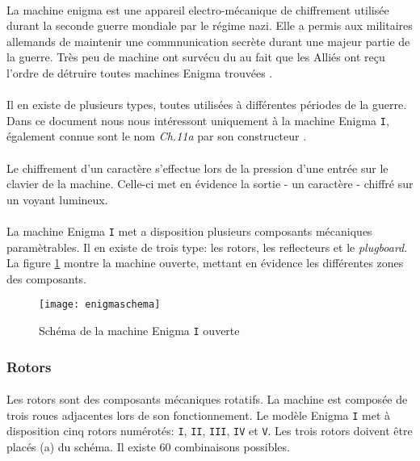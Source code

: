 \documentclass[letterpaper]{article}
\begin{document}
\paragraph{}
La machine enigma est une appareil electro-mécanique de chiffrement utilisée durant la seconde guerre mondiale
par le régime nazi. Elle a permis aux militaires allemands
de maintenir une commnunication secrète durant une majeur partie de la guerre. Très peu
de machine ont survécu du au fait que les Alliés ont reçu l'ordre de détruire toutes machines
Enigma trouvées .
\paragraph{}
Il en existe de plusieurs types, toutes utilisées à différentes périodes de la guerre. Dans ce document nous
nous intéressont uniquement à la machine Enigma \texttt{I}, également connue sont le nom \textit{Ch.11a} par son constructeur .
\paragraph{}
Le chiffrement d'un caractère s'effectue lors de la pression d'une entrée sur le clavier de la machine. 
Celle-ci met en évidence la sortie - un caractère - chiffré sur un voyant lumineux.

\paragraph{}
La machine Enigma \texttt{I} met a disposition plusieurs composants mécaniques paramètrables. Il en existe de trois type:  les rotors, les reflecteurs et le \textit{plugboard}. La figure \ref{fig:enigmaschema} montre la machine ouverte, mettant en évidence les différentes zones des composants.

\begin{figure}
    \centering
    \texttt{[image: enigmaschema]}
    \caption{Schéma de la machine Enigma \texttt{I} ouverte}
    \label{fig:enigmaschema}
\end{figure}

\subsubsection{Rotors}
\paragraph{}
Les rotors sont des composants mécaniques rotatifs. La machine est composée de trois roues adjacentes lors de son fonctionnement. Le modèle Enigma \texttt{I} met à disposition cinq rotors numérotés: \texttt{I}, \texttt{II}, \texttt{III}, \texttt{IV} et \texttt{V}. Les trois rotors doivent être placés (a) du schéma. Il existe 60 combinaisons possibles.
\end{document}
